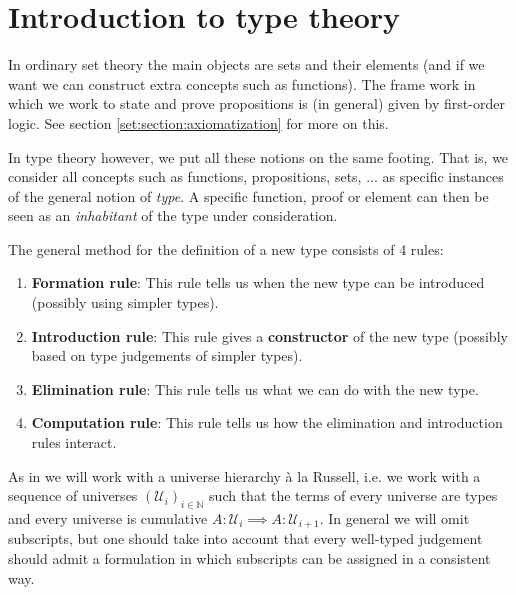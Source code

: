 \section{Introduction to type theory}

    In ordinary set theory the main objects are sets and their elements (and if we want we can construct extra concepts such as functions). The frame work in which we work to state and prove propositions is (in general) given by first-order logic. See section \ref{set:section:axiomatization} for more on this.

    In type theory however, we put all these notions on the same footing. That is, we consider all concepts such as functions, propositions, sets, ... as specific instances of the general notion of \textit{type}. A specific function, proof or element can then be seen as an \textit{inhabitant} of the type under consideration.

    \begin{method}
        The general method for the definition of a new type consists of 4 rules:
        \begin{enumerate}
            \item \textbf{Formation rule}: This rule tells us when the new type can be introduced (possibly using simpler types).
            \item \textbf{Introduction rule}: This rule gives a \textbf{constructor} of the new type (possibly based on type judgements of simpler types).
            \item \textbf{Elimination rule}: This rule tells us what we can do with the new type.
            \item \textbf{Computation rule}: This rule tells us how the elimination and introduction rules interact.
        \end{enumerate}
    \end{method}

    As in \cite{hott} we will work with a universe hierarchy \`a la Russell, i.e. we work with a sequence of universes $(\mathcal{U}_i)_{i\in\mathbb{N}}$ such that the terms of every universe are types and every universe is cumulative $A:\mathcal{U}_i\implies A:\mathcal{U}_{i+1}$. In general we will omit subscripts, but one should take into account that every well-typed judgement should admit a formulation in which subscripts can be assigned in a consistent way.

